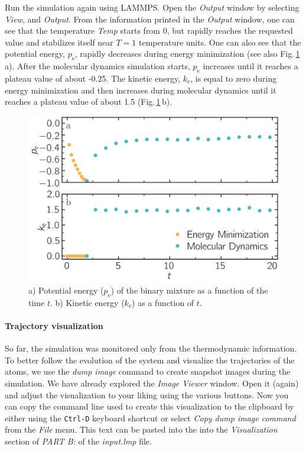 \documentclass[9pt,tutorial]{livecoms}
\begin{document}
Run the simulation again using LAMMPS. Open the \textit{Output} window
by selecting \textit{View}, and \textit{Output}. From the information
printed in the \textit{Output} window, one can see that the temperature
\textit{Temp} starts from 0, but rapidly reaches the requested value and
stabilizes itself near $T=1$ temperature units.  One can also see that
the potential energy, $p_\text{e}$, rapidly decreases during energy
minimization (see also Fig.\,\ref{fig:evolution-energy}\,a). After
the molecular dynamics simulation starts, $p_\text{e}$ increases until
it reaches a plateau value of about -0.25. The kinetic energy,
$k_\text{e}$, is equal to zero during energy minimization and then
increases during molecular dynamics until it reaches a plateau value of
about 1.5 (Fig.\,\ref{fig:evolution-energy}\,b).

\begin{figure}
\centering
\includegraphics[width=\linewidth]{LJ-energy}
\caption{a) Potential energy ($p_\text{e}$) of the binary mixture as a function
of the time $t$. b) Kinetic energy ($k_\text{e}$) as a function of $t$.}
\label{fig:evolution-energy}
\end{figure}

\paragraph{Trajectory visualization}

So far, the simulation was monitored only from the thermodynamic
information.  To better follow the evolution of the system and visualize
the trajectories of the atoms, we use the \textit{dump image} command to
create snapshot images during the simulation.  We have already explored
the \textit{Image Viewer} window.  Open it (again) and adjust the
visualization to your liking using the various buttons.  Now you can
copy the command line used to create this visualization to the clipboard
by either using the \texttt{Ctrl-D} keyboard shortcut or select
\textit{Copy dump image command} from the \textit{File} menu.  This text
can be pasted into the into the \textit{Visualization} section of
\textit{PART B:} of the \textit{input.lmp} file.
\end{document}
